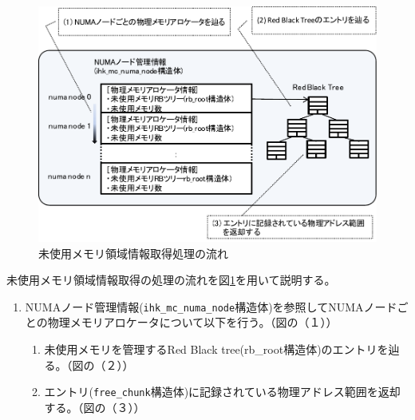 \documentclass[twoside,11pt,fleqn]{book}
\begin{document}
\subsection{}

\begin{figure}[!ht]
  \includegraphics[width=0.9\linewidth]{figs/chap01_fig010.pdf}
  \caption{未使用メモリ領域情報取得処理の流れ}
  \label{figure:chap01_fig010}
\end{figure}
\FloatBarrier
%
未使用メモリ領域情報取得の処理の流れを図\ref{figure:chap01_fig010}を用いて説明する。
\begin{enumerate}
\item NUMAノード管理情報(\texttt{ihk\_mc\_numa\_node}構造体)を参照してNUMAノードごとの物理メモリアロケータについて以下を行う。（図の（１））
\begin{enumerate}
\item 未使用メモリを管理するRed Black tree(rb\_root構造体)のエントリを辿る。（図の（２））
\item エントリ(\texttt{free\_chunk}構造体)に記録されている物理アドレス範囲を返却する。（図の（３））
\end{enumerate}
\end{enumerate}
\end{document}
